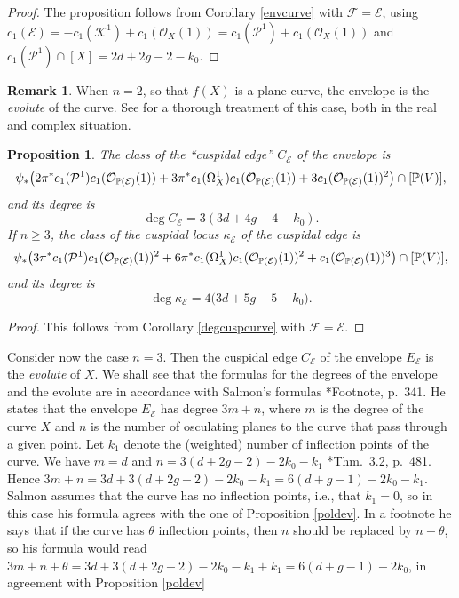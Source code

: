 \documentclass[reqno]{amsart}
\newtheorem{prop}[lemma]{Proposition}
\theoremstyle{definition}
\newtheorem{remark}[lemma]{Remark}
\theoremstyle{remark}
\begin{document}
\begin{proof}
The proposition follows from Corollary \ref{envcurve} with $\mathcal F=\mathcal E$, using $c_1(\mathcal E)=-c_1(\mathcal K^1)+c_1(\mathcal O_X(1))=c_1(\mathcal P^1)+c_1(\mathcal O_X(1))$ and $c_1(\mathcal P^1)\cap [X]=2d+2g-2-k_0$.

\end{proof}

\begin{remark} When $n=2$, so that $f(X)$ is a plane curve, the envelope is the \emph{evolute} of the curve. See \cite{ev} for a thorough treatment of this case, both in the real and complex situation.
\end{remark}

\begin{prop}\label{spaceev}
The class of the ``cuspidal edge''  $C_\mathcal E$ of the envelope is
\[
\psi_*\bigl (2\pi^*c_1(\mathcal P^1)c_1(\mathcal O_{\mathbb P(\mathcal E)}(1))\\
+3\pi^*c_1(\Omega^1_X)c_1(\mathcal O_{\mathbb P(\mathcal E)}(1))+3c_1(\mathcal O_{\mathbb P(\mathcal E)}(1))^2\bigr)\cap [\mathbb P(V)],
\]
and its degree is
\[\deg C_\mathcal E=3(3d+4g-4-k_0).\]
If $n\ge 3$, the class of the cuspidal locus $\kappa_\mathcal E$ of the cuspidal edge is
\[
\psi_*\bigl (3\pi^*c_1(\mathcal P^1)c_1(\mathcal O_{\mathbb P(\mathcal E)}(1))^2\\
+6\pi^*c_1(\Omega^1_X)c_1(\mathcal O_{\mathbb P(\mathcal E)}(1))^2+c_1(\mathcal O_{\mathbb P(\mathcal E)}(1))^3\bigr)\cap [\mathbb P(V)],
\]
and its degree is 
\[\deg \kappa_\mathcal E=4\bigl(3d+5g-5-k_0\bigr).
\]
\end{prop}

\begin{proof}
This follows from Corollary \ref{degcuspcurve} with $\mathcal F=\mathcal E$.
\end{proof}

Consider now the case $n=3$. Then the cuspidal edge $C_\mathcal E$  of the envelope $E_\mathcal E$  is the \emph{evolute}  of $X$. 
We shall see that the formulas for the degrees of the envelope and the evolute are in accordance with Salmon's formulas \cite{Salmon}*{Footnote, p.~341}. He states that the envelope $E_\mathcal E$  has degree $3m+n$, where $m$ is the degree of the curve $X$ and $n$ is the number of osculating planes to the curve that pass through a given point. 
Let $k_1$ denote the (weighted) number of inflection points of the curve. We have $m=d$ and $n=3(d+2g-2)-2k_0-k_1$ \cite{numchar}*{Thm.~3.2, p.~481}.
Hence
$3m+n=3d+3(d+2g-2)-2k_0-k_1=6(d+g-1)-2k_0-k_1$. Salmon assumes that the curve has no inflection points, i.e., that $k_1=0$, so in this case his formula agrees with the one of Proposition \ref{poldev}. In a footnote he says that if the curve has $\theta$ inflection points, then $n$ should be replaced by $n+\theta$, so his formula would read $3m+n+\theta=3d+3(d+2g-2)-2k_0-k_1+k_1=6(d+g-1)-2k_0$, in agreement with Proposition \ref{poldev}
\end{document}
